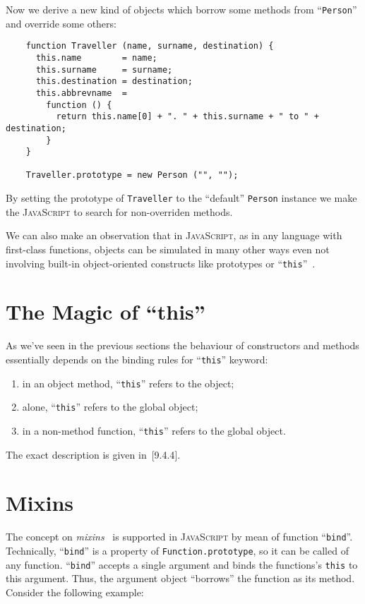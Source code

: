 \documentclass{article}
\newcommand{\js}{\textsc{JavaScript}\xspace}
\newcommand{\rf}[1]{[\textsc{#1}]}
\begin{document}
Now we derive a new kind of objects which borrow some methods from
``\lstinline|Person|'' and override some others:

\begin{lstlisting}
    function Traveller (name, surname, destination) {
      this.name        = name;
      this.surname     = surname;
      this.destination = destination;
      this.abbrevname  =
        function () {
          return this.name[0] + ". " + this.surname + " to " + destination; 
        }
    }

    Traveller.prototype = new Person ("", "");
\end{lstlisting}

By setting the prototype of \lstinline|Traveller| to the ``default'' \lstinline|Person| instance we
make the \js to search for non-overriden methods.

We can also make an observation that in \js, as in any language with first-class functions,
objects can be simulated in many other ways even not involving built-in object-oriented
constructs like prototypes or ``\lstinline|this|''~\cite{Inheritance}.

\section{The Magic of ``\textrm{this}''}
\label{sec:this}

As we've seen in the previous sections the behaviour of constructors and methods essentially
depends on the binding rules for ``\lstinline|this|'' keyword:

\begin{enumerate}
\item in an object method, ``\lstinline|this|'' refers to the object;
\item alone, ``\lstinline|this|'' refers to the global object;
\item in a non-method function, ``\lstinline|this|'' refers to the global object.
\end{enumerate}

The exact description is given in~\rf{9.4.4}.

\section{Mixins}
\label{sec:bind}

The concept on \emph{mixins}~\cite{mixins} is supported in \js by mean of
function ``\lstinline|bind|''. Technically, ``\lstinline|bind|'' is a property of
\lstinline|Function.prototype|, so it can be called of any function. ``\lstinline|bind|''
accepts a single argument and binds the functions's \lstinline|this| to this argument.
Thus, the argument object ``borrows'' the function as its method. Consider the following example:
\end{document}
